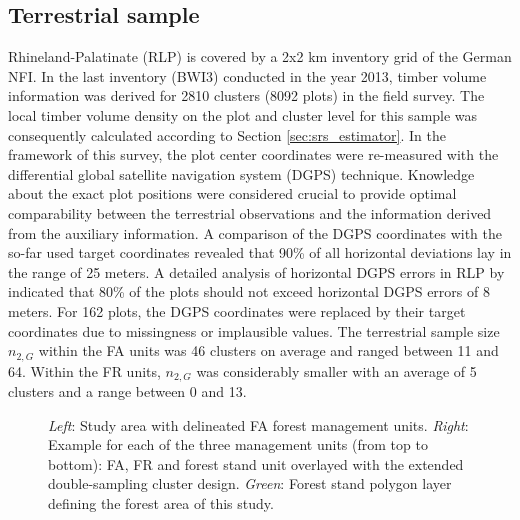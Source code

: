 


\subsection{Terrestrial sample}

Rhineland-Palatinate (RLP) is covered by a 2x2 km inventory grid of the German NFI. In the last inventory (BWI3) conducted in the year 2013, timber volume information was derived for 2810 clusters (8092 plots) in the field survey. The local timber volume density on the plot and cluster level for this sample was consequently calculated according to Section \ref{sec:srs_estimator}. In the framework of this survey, the plot center coordinates were re-measured with the differential global satellite navigation system (DGPS) technique. Knowledge about the exact plot positions were considered crucial to provide optimal comparability between the terrestrial observations and the information derived from the auxiliary information. A comparison of the DGPS coordinates with the so-far used target coordinates revealed that 90\% of all horizontal deviations lay in the range of 25 meters. A detailed analysis of horizontal DGPS errors in RLP by \citet{lambrecht2017} indicated that 80\% of the plots should not exceed horizontal DGPS errors of 8 meters. For 162 plots, the DGPS coordinates were replaced by their target coordinates due to missingness or implausible values. The terrestrial sample size $n_{2,G}$ within the FA units was 46 clusters on average and ranged between 11 and 64. Within the FR units, $n_{2,G}$ was considerably smaller with an average of 5 clusters and a range between 0 and 13.

\begin{figure}[H]
	\centering
	\caption{\textit{Left}: Study area with delineated FA forest management units. \textit{Right}: Example for each of the three management units (from top to bottom): FA, FR and forest stand unit overlayed with the extended double-sampling cluster design. \textit{Green}: Forest stand polygon layer defining the forest area of this study.}
	\label{fig:StudyArea}
\end{figure}

